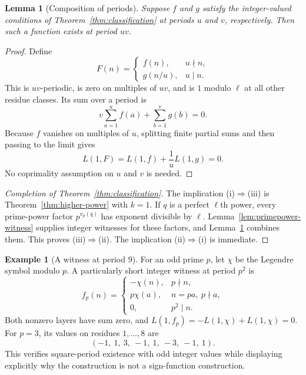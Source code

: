 \documentclass[11pt,a4paper]{article}
\newtheorem{lemma}[theorem]{Lemma}
\theoremstyle{definition}
\newtheorem{example}[theorem]{Example}
\theoremstyle{remark}
\begin{document}
\begin{lemma}[Composition of periods]\label{lem:composition}
Suppose $f$ and $g$ satisfy the integer-valued conditions of
Theorem~\ref{thm:classification} at periods $u$ and $v$, respectively.
Then such a function exists at period $uv$.
\end{lemma}

\begin{proof}
Define
\[
 F(n)=
 \begin{cases}
 f(n),&u\nmid n,\\
 g(n/u),&u\mid n.
 \end{cases}
\]
This is $uv$-periodic, is zero on multiples of $uv$, and is $1$ modulo
$\ell$ at all other residue classes. Its sum over a period is
\[
 v\sum_{a=1}^{u}f(a)+\sum_{b=1}^{v}g(b)=0.
\]
Because $f$ vanishes on multiples of $u$, splitting finite partial sums
and then passing to the limit gives
\[
 L(1,F)=L(1,f)+\frac1uL(1,g)=0.
\]
No coprimality assumption on $u$ and $v$ is needed.
\end{proof}

\begin{proof}[Completion of Theorem~\ref{thm:classification}]
The implication \textup{(i)}$\Rightarrow$\textup{(iii)} is
Theorem~\ref{thm:higher-power} with $k=1$. If $q$ is a perfect
$\ell$th power, every prime-power factor $p^{v_p(q)}$ has exponent
divisible by $\ell$. Lemma~\ref{lem:primepower-witness} supplies
integer witnesses for these factors, and
Lemma~\ref{lem:composition} combines them. This proves
\textup{(iii)}$\Rightarrow$\textup{(ii)}. The implication
\textup{(ii)}$\Rightarrow$\textup{(i)} is immediate.
\end{proof}

\begin{example}[A witness at period $9$]\label{ex:nine}
For an odd prime $p$, let $\chi$ be the Legendre symbol modulo $p$.
A particularly short integer witness at period $p^2$ is
\[
 f_p(n)=
 \begin{cases}
 -\chi(n),&p\nmid n,\\
 p\chi(a),&n=pa,\ p\nmid a,\\
 0,&p^2\mid n.
 \end{cases}
\]
Both nonzero layers have sum zero, and
$L(1,f_p)=-L(1,\chi)+L(1,\chi)=0$.
For $p=3$, its values on residues $1,\ldots,8$ are
\[
 (-1,\ 1,\ 3,\ -1,\ 1,\ -3,\ -1,\ 1).
\]
This verifies square-period existence with odd integer values while
displaying explicitly why the construction is not a sign-function
construction.
\end{example}
\end{document}
